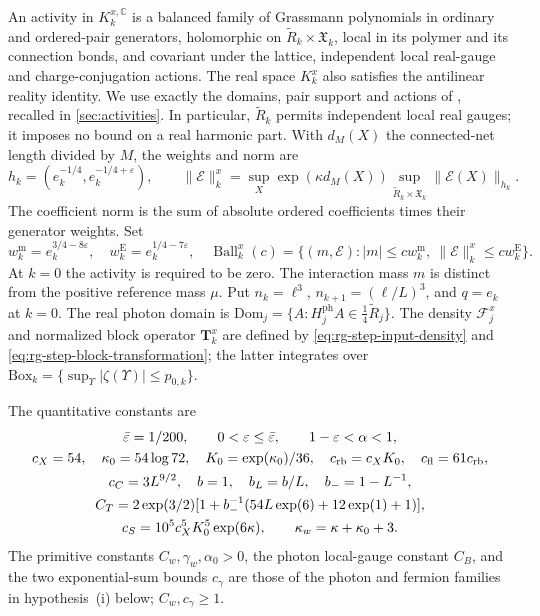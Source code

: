 \documentclass[11pt,letterpaper,reqno]{amsart}
\newcommand{\C}{\mathbb C}
\begin{document}
An activity in $K_k^{x,\C}$ is a balanced family of Grassmann
polynomials in ordinary and ordered-pair generators, holomorphic on
$\widetilde R_k\times\mathfrak X_k$, local in its polymer and its
connection bonds, and covariant under the lattice, independent local
real-gauge and charge-conjugation actions. The real space $K_k^x$
also satisfies the antilinear reality identity. We use exactly the
domains, pair support and actions of \cite[\S2]{NormalizedContraction},
recalled in \cref{sec:activities}. In particular, $\widetilde R_k$
permits independent local real gauges; it imposes no bound on a real
harmonic part. With $d_M(X)$ the connected-net length divided by $M$,
the weights and norm are
\[
 h_k=(e_k^{-1/4},e_k^{-1/4+\varepsilon}),\qquad
 \|\mathscr E\|_k^x=\sup_X\exp(\kappa d_M(X))
       \sup_{\widetilde R_k\times\mathfrak X_k}\|\mathscr E(X)\|_{h_k}.
\]
The coefficient norm is the sum of absolute ordered coefficients
times their generator weights. Set
\begin{equation}\label{eq:rg-windows}
 w_k^{\mathrm m}=e_k^{3/4-8\varepsilon},\quad
 w_k^{\mathrm E}=e_k^{1/4-7\varepsilon},\quad
 \operatorname{Ball}_k^x(c)=
 \{(m,\mathscr E):|m|\le cw_k^{\mathrm m},\
                 \|\mathscr E\|_k^x\le cw_k^{\mathrm E}\}.
\end{equation}
At $k=0$ the activity is required to be zero. The interaction mass
$m$ is distinct from the positive reference mass $\mu$. Put
$n_k=\ell^3$, $n_{k+1}=(\ell/L)^3$, and $q=e_k$ at $k=0$.
The real photon domain is
$\mathrm{Dom}_j=\{A:H_j^{\mathrm{ph}}A\in\frac14\widetilde R_j\}$.
The density $\mathscr F_j^x$ and normalized block operator $\mathbf T_k^x$
are defined by \eqref{eq:rg-step-input-density} and
\eqref{eq:rg-step-block-transformation}; the latter integrates over
$\mathrm{Box}_k=\{\sup_\Upsilon|\zeta(\Upsilon)|\le p_{0,k}\}$.

The quantitative constants are
\[
 \begin{gathered}
 \bar\varepsilon=1/200,\qquad
 0<\varepsilon\le\bar\varepsilon,\qquad 1-\varepsilon<\alpha<1,\\
 c_X=54,\quad \kappa_0=54\log72,\quad K_0=\exp(\kappa_0)/36,\quad
 c_{\rm rb}=c_XK_0,\quad c_{\rm fl}=61c_{\rm rb},\\
 c_C=3L^{9/2},\quad b=1,\quad b_L=b/L,\quad b_-=1-L^{-1},\\
 C_T=2\exp(3/2)
       [1+b_-^{-1}(54L\exp(6)+12\exp(1)+1)],\\
 c_S=10^5c_X^5K_0^5\exp(6\kappa),\qquad
 \kappa_w=\kappa+\kappa_0+3 .
 \end{gathered}
\]
The primitive constants \(C_w,\gamma_w,\alpha_0>0\), the photon
local-gauge constant \(C_B\), and the two exponential-sum bounds
\(c_\gamma\) are those of the photon and fermion families in hypothesis~(i) below; \(C_w,c_\gamma\ge1\).
\end{document}
